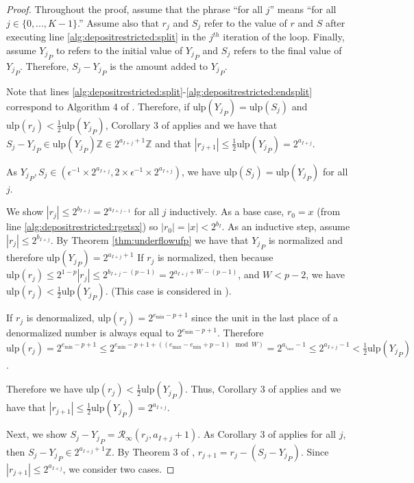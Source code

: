 \documentclass[12pt]{article}
\providecommand{\Z}{\ensuremath{\mathbb{Z}}}
\providecommand{\min}{\ensuremath{\text{min}}}
\providecommand{\max}{\ensuremath{\text{max}}}
\providecommand{\ulp}{\ensuremath{\text{ulp}}}
\providecommand{\roundtonearestinfty}{\ensuremath{\mathcal{R}_\text{$\infty$}}}
\theoremstyle{definition}
\numberwithin{equation}{section}
\numberwithin{figure}{section}
\begin{document}
      \begin{proof}
        Throughout the proof, assume that the phrase ``for all $j$'' means ``for all $j \in \{0, ..., K - 1\}$.'' Assume also that $r_j$ and $S_j$ refer to the value of $r$ and $S$ after executing line \ref{alg:depositrestricted:split} in the $j^{th}$ iteration of the loop. Finally, assume ${Y_j}_P$ to refers to the initial value of ${Y_j}_P$ and $S_j$ refers to the final value of ${Y_j}_P$. Therefore, $S_j - {Y_j}_P$ is the amount added to ${Y_j}_P$.

        Note that lines \ref{alg:depositrestricted:split}-\ref{alg:depositrestricted:endsplit} correspond to Algorithm 4 of \cite{repsum}.
        Therefore, if $\ulp({Y_j}_P) = \ulp(S_j)$ and $\ulp(r_j) < \frac{1}{2}\ulp({Y_j}_P)$, Corollary 3 of \cite{repsum} applies and we have that $S_j - {Y_j}_P \in \ulp({Y_j}_P)\Z \in 2^{a_{I + j} + 1}\Z$ and that $|r_{j + 1}| \leq \frac{1}{2}\ulp({Y_j}_P) = 2^{a_{I + j}}$.

        As ${Y_j}_P, S_j \in (\epsilon^{-1} \times 2^{a_{I + j}}, 2 \times \epsilon^{-1} \times 2^{a_{I + j}})$, we have $\ulp(S_j) = \ulp({Y_j}_P)$ for all $j$.

        We show $|r_j| \leq 2^{b_{I + j}} = 2^{a_{I + j - 1}}$ for all $j$ inductively. As a base case, $r_0 = x$ (from line \ref{alg:depositrestricted:rgetsx}) so $|r_0| = |x| < 2^{b_{I}}$.
        As an inductive step, assume $|r_j| \leq 2^{b_{I + j}}$. By Theorem \ref{thm:underflowufp} we have that ${Y_j}_P$ is normalized and therefore $\ulp({Y_j}_P) = 2^{a_{I + j} + 1}$
        If $r_j$ is normalized, then because $\ulp(r_j) \leq 2^{1 - p}|r_j| \leq 2^{b_{I + j} - (p - 1)} = 2^{a_{I + j} + W - (p - 1)}$, and $W < p - 2$, we have $\ulp(r_j) < \frac{1}{2}\ulp({Y_j}_P)$. (This case is considered in \cite{repsum}).

        If $r_j$ is denormalized, $\ulp(r_j) = 2^{e_{\min} - p + 1}$ since the unit in the last place of a denormalized number is always equal to $2^{e_{\min} - p + 1}$. Therefore $\ulp(r_j) = 2^{e_{\min} - p + 1} \leq 2^{e_{\min} - p + 1 + ((e_{\max} - e_{\min} + p - 1) \mod W)} = 2^{a_{i_{\max}} - 1} \leq 2^{a_{I + j} - 1} < \frac{1}{2}\ulp({Y_j}_P)$.

        Therefore we have $\ulp(r_j) < \frac{1}{2}\ulp({Y_j}_P)$. Thus, Corollary 3 of \cite{repsum} applies and we have that $|r_{j + 1}| \leq \frac{1}{2}\ulp({Y_j}_P) = 2^{a_{I + j}}$.

        Next, we show $S_j - {Y_j}_P = \roundtonearestinfty(r_j, a_{I + j} + 1)$. As Corollary 3 of \cite{repsum} applies for all $j$, then $S_j - {Y_j}_P \in 2^{a_{I + j} + 1}\Z$. By Theorem 3 of \cite{repsum}, $r_{j + 1} = r_j - (S_j - {Y_j}_P)$. Since $|r_{j + 1}| \leq 2^{a_{I + j}}$, we consider two cases.


\end{proof}
\end{document}
